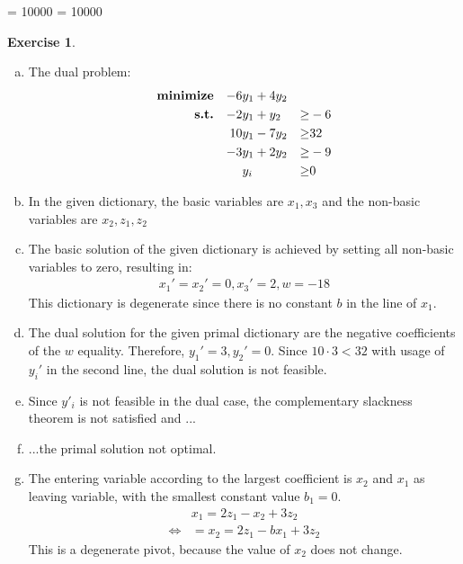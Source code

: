 \documentclass[a4paper,12pt,headsepline]{scrartcl}
\newtheorem{aufgabe}{Exercise}
\begin{document}
\widowpenalty = 10000
\displaywidowpenalty = 10000
\begin{aufgabe}
\end{aufgabe}
\begin{enumerate}[a)]
    \item The dual problem:
    \begin{align*}
        \textbf{\text{minimize}} & &-6&y_1 + 4y_2 &&\\
        \textbf{\text{s.t.}} & &-2&y_1 + y_2   &\geq &-6\\
        & &10&y_1 - 7y_2 &\geq &32\\
        & &-3&y_1 + 2y_2 &\geq &-9\\
        &&&y_i &\geq &0
    \end{align*}
    \item In the given dictionary, the basic variables are $x_1,x_3$ and the non-basic variables are $x_2,z_1,z_2$
    \item The basic solution of the given dictionary is achieved by setting all non-basic variables to zero, resulting in:
    \begin{align*}
        x_1' =x_2'= 0, x_3' = 2, w = -18
    \end{align*}
    This dictionary is degenerate since there is no constant $b$ in the line of $x_1$.
    \item The dual solution for the given primal dictionary are the negative coefficients of the $w$ equality. Therefore, $y_1' = 3, y_2' = 0$. Since $10\cdot 3 < 32 $ with usage of $y_i'$ in the second line, the dual solution is not feasible.
    \item Since $y'_i$ is not feasible in the dual case, the complementary slackness theorem is not satisfied and ...
    \item ...the primal solution not optimal.
    \item The entering variable according to the largest coefficient is $x_2$ and $x_1$ as leaving variable, with the smallest constant value $b_1 = 0$.
    \begin{align*}
        &x_1 = 2z_1 - x_2 + 3z_2\\
        \Longleftrightarrow &= x_2 = 2z_1 -b x_1 + 3z_2
    \end{align*}
    This is a degenerate pivot, because the value of $x_2$ does not change.
\end{enumerate}
\newpage
\end{document}
